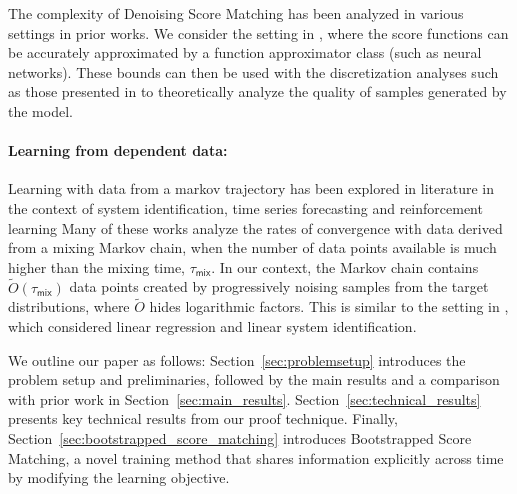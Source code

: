 The complexity of Denoising Score Matching has been analyzed in various settings \cite{chen2023score,oko2023diffusion,gupta2023sample,block2020generative} in prior works. We consider the setting in \cite{gupta2023sample,block2020generative}, where the score functions can be accurately approximated by a function approximator class (such as neural networks). These bounds can then be used with the discretization analyses such as those presented in \cite{benton2024nearly,chen2022sampling,lee2023convergence} to theoretically analyze the quality of samples generated by the model. 

\paragraph{Learning from dependent data:} Learning with data from a markov trajectory has been explored in literature in the context of system identification, time series forecasting and reinforcement learning \cite{duchi2012ergodic, simchowitz2018learning,nagaraj2020least,kowshik2021near,tu2024learning,ziemann2022learning,bhandari2018finite,kumar2024streaming,srikant2024rates}
Many of these works analyze the rates of convergence with data derived from a mixing Markov chain, when the number of data points available is much higher than the mixing time, $\tau_{\mathsf{mix}}$. In our context, the Markov chain contains $\tilde{O}(\tau_{\mathsf{mix}})$ data points created by progressively noising samples from the target distributions, where $\tilde{O}$ hides logarithmic factors. This is similar to the setting in \cite{tu2024learning}, which considered linear regression and linear system identification.

We outline our paper as follows: Section~\ref{sec:problemsetup} introduces the problem setup and preliminaries, followed by the main results and a comparison with prior work in Section~\ref{sec:main_results}. Section~\ref{sec:technical_results} presents key technical results from our proof technique. Finally, Section~\ref{sec:bootstrapped_score_matching} introduces Bootstrapped Score Matching, a novel training method that shares information explicitly across time by modifying the learning objective.